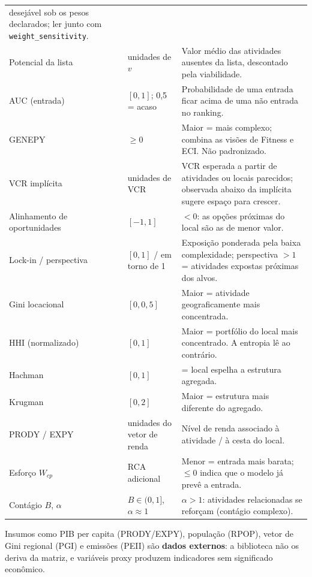 \documentclass[12pt, a4paper]{article}
\begin{document}
{\begin{longtable}{>{\raggedright\arraybackslash}p{3.4cm}>{\raggedright\arraybackslash}p{3.0cm}>{\raggedright\arraybackslash}p{8.6cm}}
  desej\'{a}vel sob os pesos declarados; ler junto com
  \texttt{weight\_sensitivity}. \\
Potencial da lista & unidades de $v$ & Valor m\'{e}dio das atividades
  ausentes da lista, descontado pela viabilidade. \\
AUC (entrada) & $[0, 1]$; 0,5 = acaso & Probabilidade de uma entrada
  ficar acima de uma n\~{a}o entrada no ranking.\\
GENEPY & $\geq 0$ & Maior = mais complexo; combina as vis\~{o}es de
  Fitness e ECI. N\~{a}o padronizado. \\
VCR impl\'{i}cita & unidades de VCR & VCR esperada a partir de atividades
  ou locais parecidos; observada abaixo da impl\'{i}cita sugere espa\c{c}o
  para crescer. \\
Alinhamento de oportunidades & $[-1, 1]$ & $<0$: as op\c{c}\~{o}es
  pr\'{o}ximas do local s\~{a}o as de menor valor. \\
Lock-in / perspectiva & $[0,1]$ / em torno de 1 & Exposi\c{c}\~{a}o
  ponderada pela baixa complexidade; perspectiva $>1$ = atividades
  expostas pr\'{o}ximas dos alvos. \\
Gini locacional & $[0, 0{,}5]$ & Maior = atividade geograficamente mais
  concentrada. \\
HHI (normalizado) & $[0, 1]$ & Maior = portf\'{o}lio do local mais
  concentrado. A entropia l\^{e} ao contr\'{a}rio. \\
Hachman & $[0, 1]$ & 1 = local espelha a estrutura agregada. \\
Krugman & $[0, 2]$ & Maior = estrutura mais diferente do agregado. \\
PRODY / EXPY & unidades do vetor de renda & N\'{i}vel de renda associado
  \`{a} atividade / \`{a} cesta do local. \\
Esfor\c{c}o $W_{cp}$ & RCA adicional & Menor = entrada mais barata;
  $\leq 0$ indica que o modelo j\'{a} prev\^{e} a entrada. \\
Cont\'{a}gio $B$, $\alpha$ & $B \in (0,1]$, $\alpha \approx 1$ &
  $\alpha > 1$: atividades relacionadas se refor\c{c}am
  (cont\'{a}gio complexo). \\
\bottomrule
\end{longtable}}

\begin{warnbox}
  Insumos como PIB per capita (PRODY/EXPY), popula\c{c}\~{a}o (RPOP),
  vetor de Gini regional (PGI) e emiss\~{o}es (PEII) s\~{a}o
  \textbf{dados externos}: a biblioteca n\~{a}o os deriva da matriz, e
  vari\'{a}veis proxy produzem indicadores sem significado
  econ\^{o}mico.
\end{warnbox}
\end{document}
